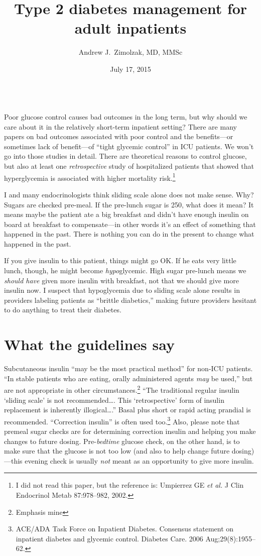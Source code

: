 \documentclass{tufte-handout}
\title{Type 2 diabetes management for adult inpatients}
\author{Andrew J.\ Zimolzak, MD, MMSc}
\date{July 17, 2015}
\begin{document}
\maketitle

~\\ %

Poor glucose control causes bad outcomes in the long term, but why
should we care about it in the relatively short-term inpatient
setting? There are many papers on bad outcomes associated with poor
control and the benefits---or sometimes lack of benefit---of ``tight
glycemic control'' in ICU patients. We won't go into those studies in
detail. There are theoretical reasons to control glucose, but also at
least one \emph{retrospective} study of hospitalized patients that
showed that hyperglycemia is associated with higher mortality
risk.\footnote{I did not read this paper, but the reference is:
  Umpierrez GE \emph{et al.} J Clin Endocrinol Metab 87:978--982,
  2002.}

I and many endocrinologists think sliding scale alone does not make
sense. Why? Sugars are checked pre-meal. If the pre-lunch sugar is
250, what does it mean? It means maybe the patient ate a big breakfast
and didn't have enough insulin on board at breakfast to
compensate---in other words it's an effect of something that happened
in the past. There is nothing you can do in the present to change what
happened in the past.

If you give insulin to this patient, things might go OK. If he eats
very little lunch, though, he might become \emph{hypo}glycemic. High
sugar pre-lunch means we \emph{should have} given more insulin with
breakfast, not that we should give more insulin now. I suspect that
hypoglycemia due to sliding scale alone results in providers labeling
patients as ``brittle diabetics,'' making future providers hesitant to
do anything to treat their diabetes.

\section{What the guidelines say}

Subcutaneous insulin ``may be the most practical method'' for non-ICU
patients. ``In stable patients who are eating, orally administered
agents \emph{may} be used,'' but are not appropriate in other
circumstances.\footnote{Emphasis mine} ``The traditional regular
insulin `sliding scale' is not recommended\ldots{}. This
`retrospective' form of insulin replacement is inherently
illogical\ldots{}.'' Basal plus short or rapid acting prandial is
recommended. ``Correction insulin'' is often used
too.\footnote{ACE/ADA Task Force on Inpatient Diabetes. Consensus
  statement on inpatient diabetes and glycemic control. Diabetes Care.
  2006 Aug;29(8):1955--62.} Also, please note that premeal sugar
checks are for determining correction insulin and helping you make
changes to future dosing. Pre-\emph{bedtime} glucose check, on the
other hand, is to make sure that the glucose is not too low (and also
to help change future dosing)---this evening check is usually
\emph{not} meant as an opportunity to give more insulin.
\end{document}
